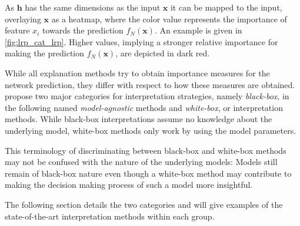\setlength{\leftskip}{0pt}
\par\smallskip\vspace{-0.1cm}

As $\mathbf{h}$ has the same dimensions as the input $\mathbf{x}$ it can be mapped to the input, overlaying $\mathbf{x}$ as a heatmap, where the color value represents the importance of feature $x_i$ towards the prediction $f_N(\mathbf{x})$.
An example is given in \autoref{fig:lrp_cat_lrp}. Higher values, implying a stronger relative importance for making the prediction $f_N(\mathbf{x})$, are depicted in dark red. 


While all explanation methods try to obtain importance measures for the network prediction, they differ with respect to how these measures are obtained. \cite{evaluating_explanations_security} propose two major categories for interpretation strategies, namely \textit{black-box}, in the following named \textit{model-agnostic} methods and \textit{white-box}, or \textit{} interpretation methods. 
While black-box interpretations assume no knowledge about the underlying model, white-box methods only work by using the model parameters. 

This terminology of discriminating between black-box and white-box methods may not be confused with the nature of the underlying models: Models still remain of black-box nature even though a white-box method may contribute to making the decision making process of such a model more insightful. %


The following section details the two categories and will give examples of the state-of-the-art interpretation methods within each group. 



